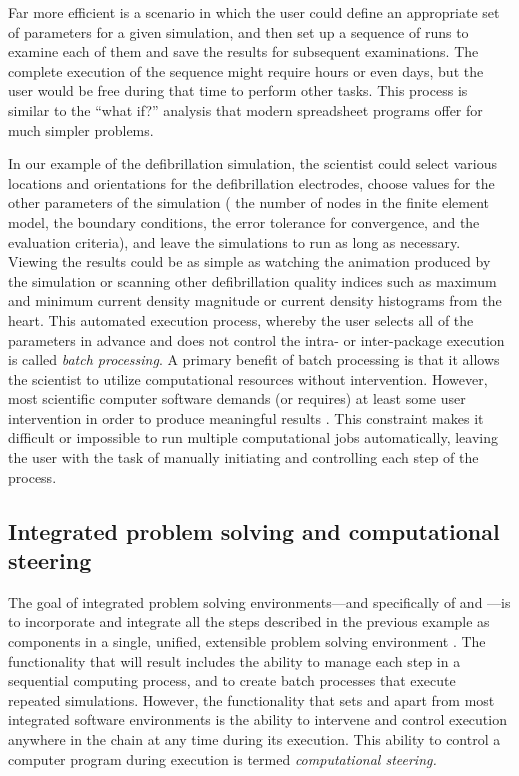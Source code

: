 Far more efficient is a scenario in which the user could define an
appropriate set of parameters for a given simulation, and then set up
a sequence of runs to examine each of them and save the results for
subsequent examinations.  The complete execution of the sequence might
require hours or even days, but the user would be free during that
time to perform other tasks.  This process is similar to the ``what
if?'' analysis that modern spreadsheet programs offer for much simpler
problems.  

In our example of the defibrillation simulation, the scientist could
select various locations and orientations for the defibrillation
electrodes, choose values for the other parameters of the simulation
(\eg{} the number of nodes in the finite element model, the boundary
conditions, the error tolerance for convergence, and the evaluation
criteria), and leave the simulations to run as long as necessary.
Viewing the results could be as simple as watching the animation
produced by the simulation or scanning other defibrillation quality
indices such as maximum and minimum current density magnitude or
current density histograms from the heart.  This automated execution
process, whereby the user selects all of the parameters in advance and
does not control the intra- or inter-package execution is called
\emph{batch processing}.  A primary benefit of batch processing is
that it allows the scientist to utilize computational resources
without intervention.  However, most scientific computer software
demands (or requires) at least some user intervention in order to
produce meaningful results .  This constraint makes it difficult or
impossible to run multiple computational jobs automatically, leaving
the user with the task of manually initiating and controlling each
step of the process.

\subsection{Integrated problem solving and computational
steering} 
\label{sec:con-steering} 

The goal of integrated problem solving environments---and specifically
of \SR{} and \BIOPSE{}---is to incorporate and integrate all the steps
described in the previous example as components in a single, unified,
extensible problem solving environment .  The functionality
that will result includes the ability to manage each step in a
sequential computing process, and to create batch processes that
execute repeated simulations.  However, the functionality that sets
\SR{} and \BIOPSE{} apart from most integrated software environments
is the ability to intervene and control execution anywhere in the
chain at any time during its execution.  This ability to control a
computer program during execution is termed \emph{computational
  steering.}

